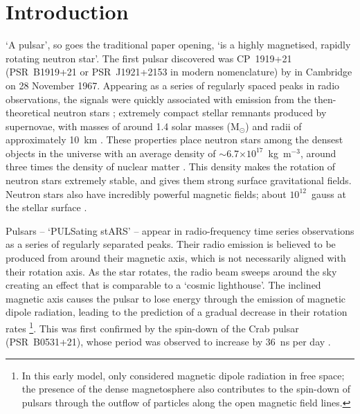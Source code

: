 \chapter{Introduction}
\label{chapt: intro}

`A pulsar', so goes the traditional paper opening, `is a highly magnetised, rapidly rotating neutron star'. The first pulsar discovered was CP~1919+21 (PSR~B1919+21 or PSR~J1921+2153 in modern nomenclature) by \citet{HBP+1968} in Cambridge on 28 November 1967. Appearing as a series of regularly spaced peaks in radio observations, the signals were quickly associated with emission from the then-theoretical neutron stars \citep{BZxx1934}; extremely compact stellar remnants produced by supernovae, with masses of around 1.4 solar masses (M$_\odot$) and radii of approximately 10~km \citep[e.g.][]{PulsarAstronomy}. These properties place neutron stars among the densest objects in the universe with an average density of $\sim$6.7$\times10^{17}$~kg~m$^{-3}$, around three times the density of nuclear matter \citep[$2.3\times10^{17}$~kg~m$^{-3}$; e.g.][]{Lxxx2001}. This density makes the rotation of neutron stars extremely stable, and gives them strong surface gravitational fields. Neutron stars also have incredibly powerful magnetic fields; about $10^{12}$~gauss at the stellar surface \citep{Gxxx1968}.

Pulsars -- `PULSating stARS' -- appear in radio-frequency time series observations as a series of regularly separated peaks. Their radio emission is believed to be produced from around their magnetic axis, which is not necessarily aligned with their rotation axis. As the star rotates, the radio beam sweeps around the sky creating an effect that is comparable to a `cosmic lighthouse'. The inclined magnetic axis causes the pulsar to lose energy through the emission of magnetic dipole radiation, leading to the prediction of a gradual decrease in their rotation rates \citep{Pxxx1968}\footnote{In this early model, \citet{Pxxx1968} only considered magnetic dipole radiation in free space; the presence of the dense magnetosphere also contributes to the spin-down of pulsars through the outflow of particles along the open magnetic field lines.}. This was first confirmed by the spin-down of the Crab pulsar (PSR~B0531+21), whose period was observed to increase by 36~ns per day \citep{RCxx1969_crab}.

